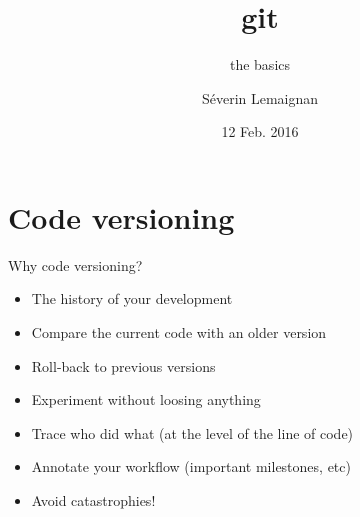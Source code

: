 \documentclass[compress]{beamer}
\title{\Medium git}
\subtitle{the basics}
\date{12 Feb. 2016}
\author{Séverin Lemaignan}
\institute{Centre for Robotics \& Neural
Systems\\{\Medium Plymouth University}}
\begin{document}
\maketitle



{
    \begin{frame}[plain]{}
    \end{frame}
}

\section{Code versioning}

\begin{frame}{Why code versioning?}

    \begin{itemize}
        \item The history of your development
        \item Compare the current code with an older version
        \item Roll-back to previous versions
        \item Experiment without loosing anything
        \item Trace who did what (at the level of the line of code)
        \item Annotate your workflow (important milestones, etc)
        \item Avoid catastrophies!
    \end{itemize}
\end{frame}
\end{document}
